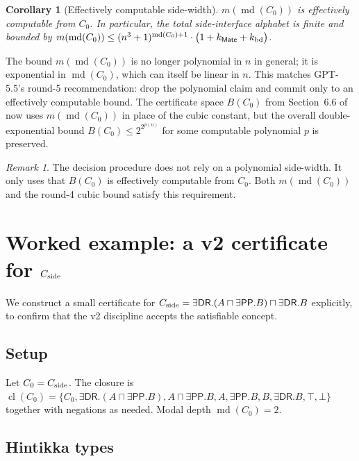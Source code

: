 \documentclass[11pt]{article}
\newtheorem{corollary}[theorem]{Corollary}
\theoremstyle{definition}
\theoremstyle{remark}
\newtheorem{remark}[theorem]{Remark}
\newcommand{\DR}{\mathsf{DR}}
\newcommand{\PP}{\mathsf{PP}}
\newcommand{\Mate}{\mathsf{Mate}}
\newcommand{\md}{\operatorname{md}}
\newcommand{\Cl}{\operatorname{cl}}
\begin{document}
\begin{corollary}[Effectively computable side-width]\label{cor:m-effective}
$m(\md(C_0))$ is effectively computable from $C_0$.  In particular,
the total side-interface alphabet is finite and bounded by
$m(\md(C_0))\leq (n^3+1)^{\md(C_0)+1}\cdot
\bigl(1+k_\Mate+k_{\rm bd}\bigr)$.
\end{corollary}

The bound $m(\md(C_0))$ is no longer polynomial in $n$ in general; it
is exponential in $\md(C_0)$, which can itself be linear in $n$.  This
matches GPT-5.5's round-5 recommendation: drop the polynomial claim
and commit only to an effectively computable bound.  The certificate
space $B(C_0)$ from Section~6.6 of \cite{GPT55Repaired} now uses
$m(\md(C_0))$ in place of the cubic constant, but the overall
double-exponential bound $B(C_0)\leq 2^{2^{p(n)}}$ for some
computable polynomial $p$ is preserved.

\begin{remark}\label{rem:bound-not-load-bearing}
The decision procedure does not rely on a polynomial side-width.  It
only uses that $B(C_0)$ is effectively computable from $C_0$.  Both
$m(\md(C_0))$ and the round-4 cubic bound satisfy this requirement.
\end{remark}

\section{Worked example: a v2 certificate for $C_{\rm side}$}
\label{sec:worked-example}

We construct a small certificate for
$C_{\rm side}=\exists\DR.(A\sqcap\exists\PP.B)\sqcap\exists\DR.B$
explicitly, to confirm that the v2 discipline accepts the satisfiable
concept.

\subsection{Setup}

Let $C_0=C_{\rm side}$.  The closure is $\Cl(C_0)=\{C_0, \exists\DR.(A
\sqcap\exists\PP.B), A\sqcap\exists\PP.B, A, \exists\PP.B, B,
\exists\DR.B, \top, \bot\}$ together with negations as needed.  Modal
depth $\md(C_0)=2$.

\subsection{Hintikka types}
\end{document}
